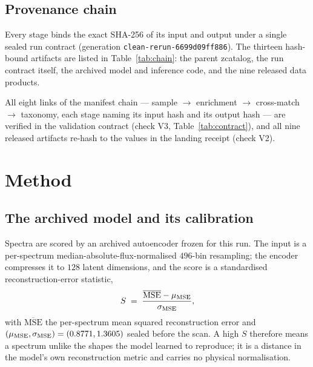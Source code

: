 \documentclass[aps,prd,twocolumn,superscriptaddress,nofootinbib,longbibliography,floatfix]{revtex4-2}
\begin{document}
\subsection{Provenance chain}
\label{sec:provenance}
Every stage binds the exact SHA-256 of its input and output under a single
sealed run contract (generation \texttt{clean-rerun-6699d09ff886}). The
thirteen hash-bound artifacts are listed in Table~\ref{tab:chain}: the parent
zcatalog, the run contract itself, the archived model and inference code, and
the nine released data products.

\begin{table}[t]
\caption{The hash-bound provenance chain. Nine released data products are
re-hashed at publication time and matched against the landing receipt
(check V2); the run contract, archived model and parent zcatalog hashes are
recorded and chain-bound (check V3); the inference-code hash is recorded in
the run contract.}
\label{tab:chain}

\end{table}

All eight links of the manifest chain --- sample $\to$ enrichment $\to$
cross-match $\to$ taxonomy, each stage naming its input hash and its output
hash --- are verified in the validation contract (check V3,
Table~\ref{tab:contract}), and all nine released artifacts re-hash to the
values in the landing receipt (check V2).

\section{Method}
\label{sec:method}

\subsection{The archived model and its calibration}
Spectra are scored by an archived autoencoder frozen for this run. The input
is a per-spectrum median-absolute-flux-normalised $496$-bin
resampling;
the encoder compresses it to $128$ latent
dimensions,
and the score is a standardised reconstruction-error statistic,
\begin{equation}
  S \;=\; \frac{\overline{\mathrm{MSE}} - \mu_{\rm MSE}}{\sigma_{\rm MSE}},
  \label{eq:score}
\end{equation}
with $\overline{\mathrm{MSE}}$ the per-spectrum mean squared reconstruction
error and $(\mu_{\rm MSE}, \sigma_{\rm MSE}) = (0.8771, 1.3605)$ sealed before
the scan.
A high $S$ therefore means a spectrum unlike the shapes the model learned to
reproduce; it is a distance in the model's own reconstruction metric and
carries no physical normalisation.
\end{document}

